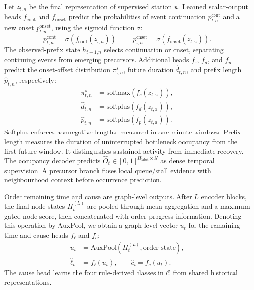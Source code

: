 \documentclass[a4paper,fleqn]{cas-dc}
\begin{document}
Let $z_{t,n}$ be the final representation of supervised station $n$. Learned scalar-output heads $f_{\mathrm{cont}}$ and $f_{\mathrm{onset}}$ predict the probabilities of event continuation $p^{\mathrm{cont}}_{t,n}$ and a new onset $p^{\mathrm{onset}}_{t,n}$, using the sigmoid function $\sigma$:
\begin{equation}
p^{\mathrm{cont}}_{t,n}=\sigma(f_{\mathrm{cont}}(z_{t,n})),
\qquad
p^{\mathrm{onset}}_{t,n}=\sigma(f_{\mathrm{onset}}(z_{t,n})).
\end{equation}
The observed-prefix state $h_{t-1,n}$ selects continuation or onset, separating continuing events from emerging precursors. Additional heads $f_s$, $f_d$, and $f_p$ predict the onset-offset distribution $\pi^s_{t,n}$, future duration $\hat d_{t,n}$, and prefix length $\hat p_{t,n}$, respectively:
\begin{equation}
\begin{aligned}
\pi^s_{t,n}&=\mathrm{softmax}(f_s(z_{t,n})),\\
\hat d_{t,n}&=\mathrm{softplus}(f_d(z_{t,n})),\\
\hat p_{t,n}&=\mathrm{softplus}(f_p(z_{t,n})).
\end{aligned}
\end{equation}
Softplus enforces nonnegative lengths, measured in one-minute windows. Prefix length measures the duration of uninterrupted bottleneck occupancy from the first future window. It distinguishes sustained activity from immediate recovery.
The occupancy decoder predicts $\hat O_t\in[0,1]^{H_{\mathrm{label}}\times N}$ as dense temporal supervision. A precursor branch fuses local queue/stall evidence with neighbourhood context before occurrence prediction.

Order remaining time and cause are graph-level outputs. After $L$ encoder blocks, the final node states $H_t^{(L)}$ are pooled through mean aggregation and a maximum gated-node score, then concatenated with order-progress information. Denoting this operation by $\mathrm{AuxPool}$, we obtain a graph-level vector $u_t$ for the remaining-time and cause heads $f_\ell$ and $f_c$:
\begin{equation}
\begin{aligned}
u_t&=\mathrm{AuxPool}(H_t^{(L)},\text{order state}),\\
\hat\ell_t&=f_\ell(u_t),\qquad \hat c_t=f_c(u_t).
\end{aligned}
\end{equation}
The cause head learns the four rule-derived classes in $\mathcal{C}$ from shared historical representations.
\end{document}
